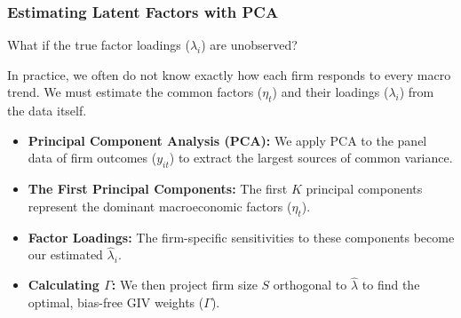 \documentclass[aspectratio=169,11pt]{beamer}
\begin{document}
\begin{frame}[shrink=5]
    \frametitle{Estimating Latent Factors with PCA}
    
    {\large
        What if the true factor loadings ($\lambda_i$) are unobserved?
    }
    
    \vspace{0.1cm}
    In practice, we often do not know exactly how each firm responds to every macro trend. We must estimate the common factors ($\eta_t$) and their loadings ($\lambda_i$) from the data itself.
    
    \begin{itemize}
        \item \textbf{Principal Component Analysis (PCA):} We apply PCA to the panel data of firm outcomes ($y_{it}$) to extract the largest sources of common variance.
        \item \textbf{The First Principal Components:} The first $K$ principal components represent the dominant macroeconomic factors ($\eta_t$).
        \item \textbf{Factor Loadings:} The firm-specific sensitivities to these components become our estimated $\hat{\lambda}_i$.
        \item \textbf{Calculating $\Gamma$:} We then project firm size $S$ orthogonal to $\hat{\lambda}$ to find the optimal, bias-free GIV weights ($\Gamma$).
    \end{itemize}
\end{frame}
\end{document}
